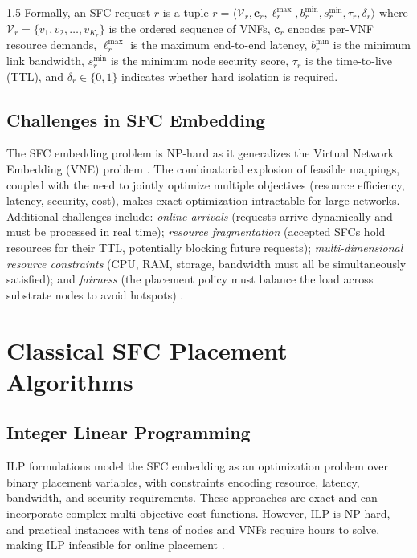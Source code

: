 \documentclass[A4paper,12pt]{report}
\theoremstyle{plain}
\theoremstyle{definition}
\theoremstyle{remark}
\numberwithin{equation}{section}
\begin{document}
\begin{spacing}{1.5}
Formally, an SFC request $r$ is a tuple $r = \langle \mathcal{V}_r, \mathbf{c}_r, \ell_r^{\max}, b_r^{\min}, s_r^{\min}, \tau_r, \delta_r \rangle$ where $\mathcal{V}_r = \{v_1, v_2, \ldots, v_{K_r}\}$ is the ordered sequence of VNFs, $\mathbf{c}_r$ encodes per-VNF resource demands, $\ell_r^{\max}$ is the maximum end-to-end latency, $b_r^{\min}$ is the minimum link bandwidth, $s_r^{\min}$ is the minimum node security score, $\tau_r$ is the time-to-live (TTL), and $\delta_r \in \{0,1\}$ indicates whether hard isolation is required.

\subsection{Challenges in SFC Embedding}

The SFC embedding problem is NP-hard as it generalizes the Virtual Network Embedding (VNE) problem \cite{yu2008}. The combinatorial explosion of feasible mappings, coupled with the need to jointly optimize multiple objectives (resource efficiency, latency, security, cost), makes exact optimization intractable for large networks. Additional challenges include: \textit{online arrivals} (requests arrive dynamically and must be processed in real time); \textit{resource fragmentation} (accepted SFCs hold resources for their TTL, potentially blocking future requests); \textit{multi-dimensional resource constraints} (CPU, RAM, storage, bandwidth must all be simultaneously satisfied); and \textit{fairness} (the placement policy must balance the load across substrate nodes to avoid hotspots) \cite{nfv5g2017}.

\section{Classical SFC Placement Algorithms}

\subsection{Integer Linear Programming}

ILP formulations \cite{cohen2015, bari2015} model the SFC embedding as an optimization problem over binary placement variables, with constraints encoding resource, latency, bandwidth, and security requirements. These approaches are exact and can incorporate complex multi-objective cost functions. However, ILP is NP-hard, and practical instances with tens of nodes and VNFs require hours to solve, making ILP infeasible for online placement \cite{nfv5g2017}.


\end{spacing}
\end{document}
